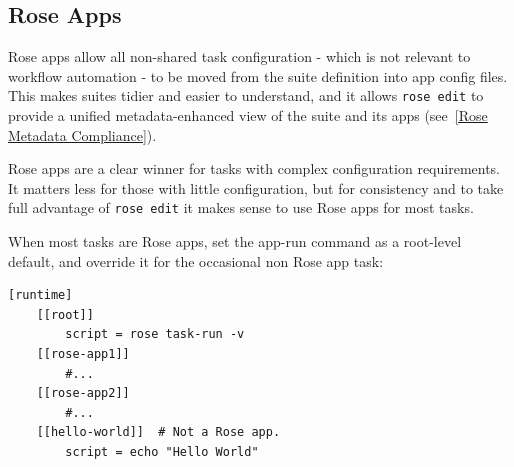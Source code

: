 

\subsection{Rose Apps}

Rose apps allow all non-shared task configuration - which is not relevant to
workflow automation - to be moved from the suite definition into app config
files. This makes suites tidier and easier to understand, and it allows
\lstinline=rose edit= to provide a unified metadata-enhanced view of the suite
and its apps (see~\ref{Rose Metadata Compliance}).

Rose apps are a clear winner for tasks with complex configuration requirements.
It matters less for those with little configuration, but for consistency and to
take full advantage of \lstinline=rose edit= it makes sense to use Rose apps
for most tasks.

When most tasks are Rose apps, set the app-run command as a root-level default,
and override it for the occasional non Rose app task:

\lstset{language=suiterc}
\begin{lstlisting}
[runtime]
    [[root]]
        script = rose task-run -v
    [[rose-app1]]
        #...
    [[rose-app2]]
        #...
    [[hello-world]]  # Not a Rose app.
        script = echo "Hello World"
\end{lstlisting}

